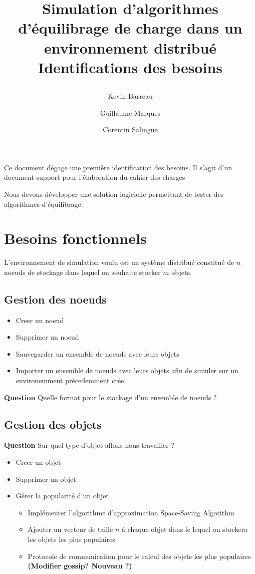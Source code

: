\documentclass[12pt]{article}
\title{
 \begin{minipage}\linewidth
        \centering
        Simulation d'algorithmes d'équilibrage de charge dans un environnement distribué 
        \vskip3pt
        \large Identifications des besoins
    \end{minipage}
 }
\author{Kevin Barreau \and Guillaume Marques \and Corentin Salingue}
\begin{document}
\maketitle

\abstract
Ce document dégage une première identification des besoins.
Il s'agit d'un document support pour l'élaboration du cahier des charges

\vspace{0.5cm}

Nous devons développer une solution logicielle permettant de tester des algorithmes d'équilibrage.


\section{Besoins fonctionnels}

L'environnement de simulation voulu est un système distribué constitué de $n$ noeuds de stockage dans lequel on souhaite stocker $m$ objets.

\subsection{Gestion des noeuds}


\begin{itemize}
 \item Creer un noeud
 \item Supprimer un noeud
 \item Sauvegarder un ensemble de noeuds avec leurs objets
 \item Importer un ensemble de noeuds avec leurs objets afin de simuler sur un environemment précedemment crée.
\end{itemize}

\vspace{0.5cm}

\textbf{Question } Quelle format pour le stockage d'un ensemble de noeuds ? \newline


\subsection{Gestion des objets}

\textbf{Question } Sur quel type d'objet allons-nous travailler ? \newline

\begin{itemize}
 \item Creer un objet
 \item Supprimer un objet
 \item Gérer la popularité d'un objet
 \begin{itemize}
  \item Implémenter l'algorithme d'approximation Space-Saving Algorithm
  \item Ajouter un vecteur de taille $n$ à chaque objet dans le lequel on stockera les objets les plus populaires
  \item Protocole de communication pour le calcul des objets les plus populaires \textbf{(Modifier gossip? Nouveau ?)}
 \end{itemize}
\end{itemize}
\end{document}
